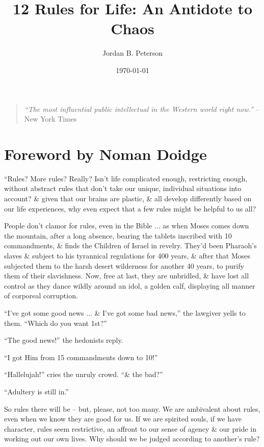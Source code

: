 \documentclass{article}
\title{12 Rules for Life: An Antidote to Chaos}
\author{Jordan B. Peterson}
\date{\today}
\numberwithin{equation}{section}
\begin{document}
\maketitle
\tableofcontents
\vspace{5mm}
\begin{quotation}
	\textit{``The most influential public intellectual in the Western world right now.''} -- New York Times
\end{quotation}


\section{Foreword by Noman Doidge}
``Rules? More rules? Really? Isn't life complicated enough, restricting enough, without abstract rules that don't take our unique, individual situations into account? \& given that our brains are plastic, \& all develop differently based on our life experiences, why even expect that a few rules might be helpful to us all?

People don't clamor for rules, even in the Bible $\ldots$ as when Moses comes down the mountain, after a long absence, bearing the tablets inscribed with 10 commandments, \& finds the Children of Israel in revelry. They'd been Pharaoh's slaves \& subject to his tyrannical regulations for 400 years, \& after that Moses subjected them to the harsh desert wilderness for another 40 years, to purify them of their slavishness. Now, free at last, they are unbridled, \& have lost all control as they dance wildly around an idol, a golden calf, displaying all manner of corporeal corruption.

``I've got some good news $\ldots$ \& I've got some bad news,'' the lawgiver yells to them. ``Which do you want 1st?''

``The good news!'' the hedonists reply.

``I got Him from 15 commandments down to 10!''

``Hallelujah!'' cries the unruly crowd. ``\& the bad?''

``Adultery is still in.''

So rules there will be -- but, please, not too many. We are ambivalent about rules, even when we know they are good for us. If we are spirited souls, if we have character, rules seem restrictive, an affront to our sense of agency \& our pride in working out our own lives. Why should we be judged according to another's rule?
\end{document}
